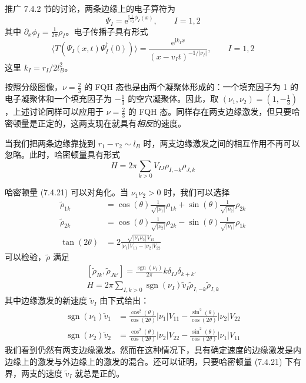 推广 7.4.2 节的讨论，两条边缘上的电子算符为
\begin{equation*}
\Psi_I=\mathrm{e}^{\mathrm{i}\frac{1}{\nu_I}\phi_I(x)},\qquad I=1,2
\tag{7.4.20}
\end{equation*}
其中 $\partial_x\phi_I=\frac{1}{2\pi}\rho_I$。电子传播子具有形式
\begin{equation*}
\langle T(\Psi_I(x,t)\Psi_I^\dagger(0))\rangle=\frac{\mathrm{e}^{\mathrm{i}k_Ix}}{(x-v_I t)^{-1/|\nu_I|}},\qquad I=1,2
\end{equation*}
这里 $k_I=r_I/2l_B^2$。

按照分级图像，$\nu=\frac{2}{3}$ 的 FQH 态也是由两个凝聚体形成的：一个填充因子为 1 的电子凝聚体和一个填充因子为 $-\frac{1}{3}$ 的空穴凝聚体。因此，取 $(\nu_1,\nu_2)=(1,-\frac{1}{3})$，上述讨论同样可以应用于 $\nu=\frac{2}{3}$ 的 FQH 态。同样存在两支边缘激发，但只要哈密顿量是正定的，这两支现在就具有\emph{相反}的速度。

当我们把两条边缘靠拢到 $r_1-r_2\sim l_B$ 时，两支边缘激发之间的相互作用不再可以忽略。此时，哈密顿量具有形式
\begin{equation*}
H=2\pi\sum_{k>0}V_{IJ}\rho_{I,-k}\rho_{J,k}
\tag{7.4.21}
\end{equation*}

哈密顿量 (7.4.21) 可以对角化。当 $\nu_1\nu_2>0$ 时，我们可以选择
\begin{align*}
\tilde{\rho}_{1k}&=\cos(\theta)\frac{1}{\sqrt{|\nu_1|}}\rho_{1k}+\sin(\theta)\frac{1}{\sqrt{|\nu_2|}}\rho_{2k}\\
\tilde{\rho}_{2k}&=\cos(\theta)\frac{1}{\sqrt{|\nu_2|}}\rho_{2k}-\sin(\theta)\frac{1}{\sqrt{|\nu_1|}}\rho_{1k}\\
\tan(2\theta)&=2\frac{\sqrt{|\nu_1\nu_2|}V_{12}}{|\nu_1|V_{11}-|\nu_2|V_{22}}
\tag{7.4.22}
\end{align*}
可以检验，$\tilde{\rho}$ 满足
\begin{equation*}
\begin{gathered}
[\tilde{\rho}_{Ik},\tilde{\rho}_{Jk'}]=\frac{\operatorname{sgn}(\nu_I)}{2\pi}k\delta_{IJ}\delta_{k+k'}\\
H=2\pi\sum_{I,k>0}\operatorname{sgn}(\nu_I)\tilde{v}_I\tilde{\rho}_{I,-k}\tilde{\rho}_{I,k}
\end{gathered}
\tag{7.4.23}
\end{equation*}
其中边缘激发的新速度 $\tilde{v}_I$ 由下式给出：
\begin{align*}
\operatorname{sgn}(\nu_1)\tilde{v}_1&=\frac{\cos^2(\theta)}{\cos(2\theta)}|\nu_1|V_{11}-\frac{\sin^2(\theta)}{\cos(2\theta)}|\nu_2|V_{22}\\
\operatorname{sgn}(\nu_2)\tilde{v}_2&=\frac{\cos^2(\theta)}{\cos(2\theta)}|\nu_2|V_{22}-\frac{\sin^2(\theta)}{\cos(2\theta)}|\nu_1|V_{11}
\tag{7.4.24}
\end{align*}
我们看到仍然有两支边缘激发。然而在这种情况下，具有确定速度的边缘激发是内边缘上的激发与外边缘上的激发的混合。还可以证明，只要哈密顿量 (7.4.21) 下有界，两支的速度 $\tilde{v}_I$ 就总是正的。

